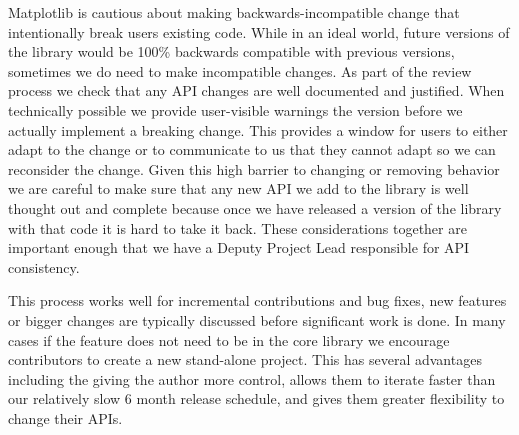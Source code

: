 \documentclass[12pt]{article}
\numberwithin{page}{section}
\begin{document}
Matplotlib is cautious about making backwards-incompatible change that
intentionally break users existing code.  While in an ideal world,
future versions of the library would be 100\% backwards compatible
with previous versions, sometimes we do need to make incompatible
changes.  As part of the review process we check that any API changes
are well documented and justified.  When technically possible we
provide user-visible warnings the version before we actually implement
a breaking change.  This provides a window for users to either adapt
to the change or to communicate to us that they cannot adapt so we
can reconsider the change.  Given this high barrier to changing or
removing behavior we are careful to make sure that any new API we add
to the library is well thought out and complete because once we have
released a version of the library with that code it is hard to take it
back.  These considerations together are important enough that we have
a Deputy Project Lead responsible for API consistency.

This process works well for incremental contributions and bug fixes,
new features or bigger changes are typically discussed before
significant work is done.  In many cases if the feature does not need
to be in the core library we encourage contributors to create a new
stand-alone project.  This has several advantages including the giving
the author more control, allows them to iterate faster than our
relatively slow 6 month release schedule, and gives them greater
flexibility to change their APIs.


\newpage

\def\ref@jnl#1{{\rm#1}}
\end{document}
